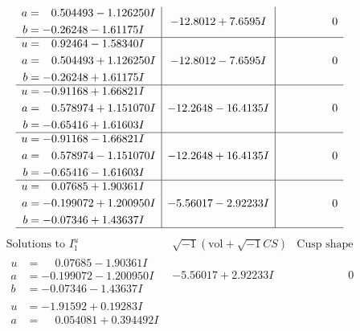 \documentclass[1p]{elsarticle_modified}
\theoremstyle{definition}
\newcommand{\I}{\sqrt{-1}}
\begin{document}
$$\begin{array}{c|c|c}
\begin{aligned}
a &= \phantom{-}0.504493 - 1.126250 I \\
b &= -0.26248 - 1.61175 I\end{aligned}
 & -12.8012 + 7.6595 I & \phantom{-0.000000 } 0 \\ \hline\begin{aligned}
u &= \phantom{-}0.92464 - 1.58340 I \\
a &= \phantom{-}0.504493 + 1.126250 I \\
b &= -0.26248 + 1.61175 I\end{aligned}
 & -12.8012 - 7.6595 I & \phantom{-0.000000 } 0 \\ \hline\begin{aligned}
u &= -0.91168 + 1.66821 I \\
a &= \phantom{-}0.578974 + 1.151070 I \\
b &= -0.65416 + 1.61603 I\end{aligned}
 & -12.2648 - 16.4135 I & \phantom{-0.000000 } 0 \\ \hline\begin{aligned}
u &= -0.91168 - 1.66821 I \\
a &= \phantom{-}0.578974 - 1.151070 I \\
b &= -0.65416 - 1.61603 I\end{aligned}
 & -12.2648 + 16.4135 I & \phantom{-0.000000 } 0 \\ \hline\begin{aligned}
u &= \phantom{-}0.07685 + 1.90361 I \\
a &= -0.199072 + 1.200950 I \\
b &= -0.07346 + 1.43637 I\end{aligned}
 & -5.56017 - 2.92233 I & \phantom{-0.000000 } 0\\
 \hline 
 \end{array}$$\newpage$$\begin{array}{c|c|c}  
\text{Solutions to }I^u_{1}& \I (\text{vol} + \sqrt{-1}CS) & \text{Cusp shape}\\
 \hline 
\begin{aligned}
u &= \phantom{-}0.07685 - 1.90361 I \\
a &= -0.199072 - 1.200950 I \\
b &= -0.07346 - 1.43637 I\end{aligned}
 & -5.56017 + 2.92233 I & \phantom{-0.000000 } 0 \\ \hline\begin{aligned}
u &= -1.91592 + 0.19283 I \\
a &= \phantom{-}0.054081 + 0.394492 I \\

\end{aligned}
\end{array}$$
\end{document}
